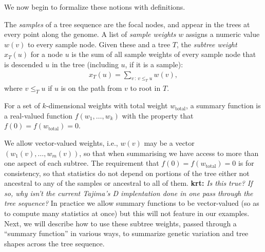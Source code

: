 \documentclass{article}
\newcommand{\iw}{w} %
\newcommand{\tiw}{w_\text{total}} %
\newcommand{\nw}{x} %
\newcommand{\krt}[1]{{\color{green}\textbf{krt:} \it #1}}
\begin{document}
We now begin to formalize these notions with definitions.


\begin{definition}
    The \emph{samples} of a tree sequence are the focal nodes,
    and appear in the trees at every point along the genome.
    A list of \emph{sample weights} $\iw$ assigns a numeric value $\iw(v)$
    to every sample node.
    Given these and a tree $T$,
    the \emph{subtree weight} $\nw_T(u)$ for a node $u$ is the sum of all sample weights
    of every sample node that is descended $u$ in the tree (including $u$, if it is a sample):
    \begin{align*}
        \nw_T(u) = \sum_{v \,:\, v \le_T u} \iw(v) ,
    \end{align*}
    where $v \le_T u$ if $u$ is on the path from $v$ to root in $T$.
\end{definition}

\begin{definition}
    For a set of $k$-dimensional weights with total weight $\tiw$,
    a summary function is a real-valued function $f(w_1, \ldots, w_k)$
    with the property that $f(0) = f(\tiw) = 0$.
\end{definition}

We allow vector-valued weights,
i.e., $\iw(v)$ may be a vector $(\iw_1(v), \ldots, \iw_m(v))$,
so that when summarising we have access to more than one aspect of each subtree.
The requirement that $f(0) = f(\tiw) = 0$ is for consistency,
so that statistics do not depend on portions of the tree either not ancestral to any of the samples or ancestral to all
of them.
\krt{Is this true?  If so, why isn't the current Tajima's D implentation done in one pass through the tree sequence?}
In practice we allow summary functions to be vector-valued (so as to compute many statistics at once)
but this will not feature in our examples.
Next, we will describe how to use these subtree weights,
passed through a ``summary function'' in various ways,
to summarize genetic variation and tree shapes across the tree sequence.
\end{document}
